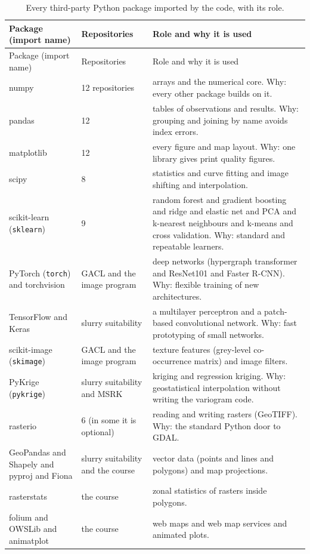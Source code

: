 \documentclass[11pt,a4paper]{article}
\begin{document}
\begin{longtable}{@{}R{2.9cm}R{3.6cm}R{8.5cm}@{}}
\caption{Every third-party Python package imported by the code, with its role.}\label{tab:py}\\
\toprule Package (import name) & Repositories & Role and why it is used\\\midrule\endfirsthead
\toprule Package (import name) & Repositories & Role and why it is used\\\midrule\endhead
numpy & 12 repositories & arrays and the numerical core. Why: every other package builds on it.\\
pandas & 12 & tables of observations and results. Why: grouping and joining by name avoids index errors.\\
matplotlib & 12 & every figure and map layout. Why: one library gives print quality figures.\\
scipy & 8 & statistics and curve fitting and image shifting and interpolation.\\
scikit-learn (\texttt{sklearn}) & 9 & random forest and gradient boosting and ridge and elastic net and PCA and k-nearest neighbours and k-means and cross validation. Why: standard and repeatable learners.\\
PyTorch (\texttt{torch}) and torchvision & GACL and the image program & deep networks (hypergraph transformer and ResNet101 and Faster R-CNN). Why: flexible training of new architectures.\\
TensorFlow and Keras & slurry suitability & a multilayer perceptron and a patch-based convolutional network. Why: fast prototyping of small networks.\\
scikit-image (\texttt{skimage}) & GACL and the image program & texture features (grey-level co-occurrence matrix) and image filters.\\
PyKrige (\texttt{pykrige}) & slurry suitability and MSRK & kriging and regression kriging. Why: geostatistical interpolation without writing the variogram code.\\
rasterio & 6 (in some it is optional) & reading and writing rasters (GeoTIFF). Why: the standard Python door to GDAL.\\
GeoPandas and Shapely and pyproj and Fiona & slurry suitability and the course & vector data (points and lines and polygons) and map projections.\\
rasterstats & the course & zonal statistics of rasters inside polygons.\\
folium and OWSLib and animatplot & the course & web maps and web map services and animated plots.\\

\end{longtable}
\end{document}
